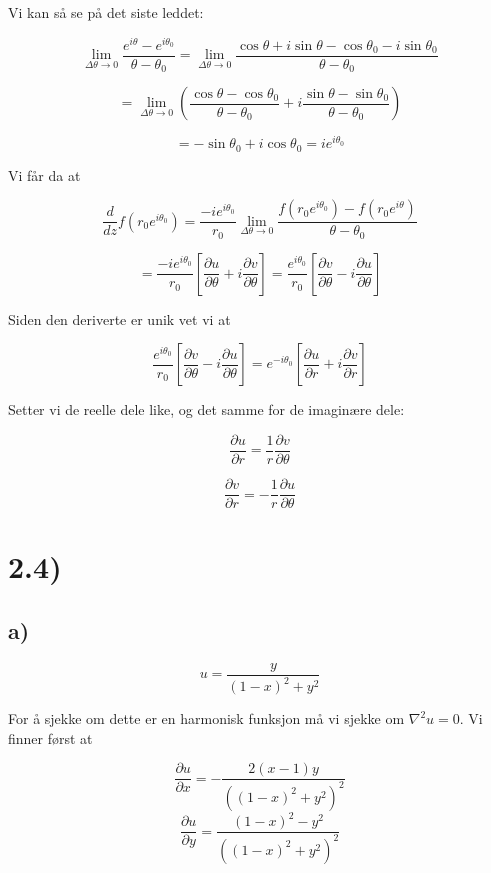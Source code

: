\documentclass[a4paper,norsk, 10pt]{article}
\begin{document}
Vi kan så se på det siste leddet:

$$
\lim_{\Delta \theta \rightarrow 0} \frac{e^{i\theta}-e^{i\theta_0}}{\theta - \theta_0} = \lim_{\Delta \theta \rightarrow 0} \frac{\cos\theta + i\sin\theta - \cos\theta_0 - i\sin\theta_0}{\theta - \theta_0}
$$

$$
= \lim_{\Delta \theta \rightarrow 0}\left(\frac{\cos\theta - \cos\theta_0}{\theta - \theta_0} + i\frac{\sin\theta - \sin\theta_0}{\theta - \theta_0}\right)
$$

$$
= -\sin\theta_0  + i\cos\theta_0 = ie^{i\theta_0}
$$

Vi får da at

$$
\frac{d}{dz} f(r_0e^{i\theta_0}) = \frac{-ie^{i\theta_0}}{r_0} \lim_{\Delta \theta \rightarrow 0} \frac{f(r_0e^{i\theta_0})-f(r_0e^{i\theta})}{\theta - \theta_0}
$$

$$
= \frac{-ie^{i\theta_0}}{r_0} \left[\frac{\partial u}{\partial \theta} + i\frac{\partial v}{\partial \theta}\right] = \frac{e^{i\theta_0}}{r_0} \left[\frac{\partial v}{\partial \theta} - i\frac{\partial u}{\partial \theta}\right]
$$

Siden den deriverte er unik vet vi at

$$
\frac{e^{i\theta_0}}{r_0} \left[\frac{\partial v}{\partial \theta} - i\frac{\partial u}{\partial \theta}\right] = e^{-i\theta_0} \left[\frac{\partial u}{\partial r} + i\frac{\partial v}{\partial r}\right]
$$

Setter vi de reelle dele like, og det samme for de imaginære dele:

$$
\frac{\partial u}{\partial r} = \frac{1}{r}\frac{\partial v}{\partial \theta}
$$

$$
\frac{\partial v}{\partial r} = -\frac{1}{r}\frac{\partial u}{\partial \theta}
$$


\section*{2.4)}
\subsection*{a)}

$$
u = \frac{y}{(1-x)^2 + y^2}
$$

For å sjekke om dette er en harmonisk funksjon må vi sjekke om $\nabla^2 u = 0$. Vi finner først at

$$
\frac{\partial u}{\partial x} = -\frac{2(x-1)y}{((1-x)^2 + y^2)^2}
$$
$$
\frac{\partial u}{\partial y} = \frac{(1-x)^2-y^2}{((1-x)^2 + y^2)^2} 
$$
\end{document}
